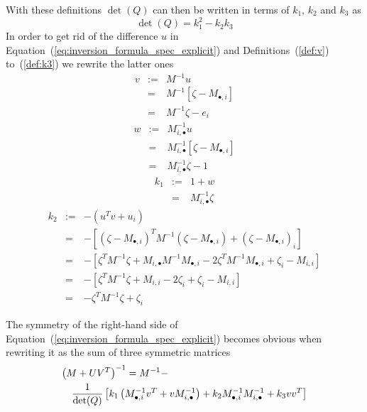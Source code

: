 \documentclass[a4paper]{article}
\begin{document}
With these definitions $\det(Q)$ can then be written in terms of
$k_{1}$, $k_{2}$ and $k_{3}$ as
\begin{equation}
\label{def:det_Q_k}
\det(Q)=k_{1}^{2}-k_{2}k_{3}
\end{equation}
In order to get rid of the difference $u$
in Equation~(\ref{eq:inversion_formula_spec_explicit}) and
Definitions~(\ref{def:v}) to~(\ref{def:k3}) we rewrite the latter ones
\begin{eqnarray}
\label{def:v_zeta}
v
&:=&
M^{-1}u
\nonumber \\
&=& 
M^{-1}\left[\zeta - M_{\bullet, i}\right]
\nonumber \\
&=&
M^{-1}\zeta - e_{i}
\end{eqnarray}
\begin{eqnarray}
\label{def:w_zeta}
w
&:=&
M^{-1}_{i, \bullet}u
\nonumber \\
&=&
M^{-1}_{i, \bullet}\left[\zeta - M_{\bullet, i}\right] 
\nonumber \\
&=&
M^{-1}_{i, \bullet}\zeta - 1
\end{eqnarray}
\begin{eqnarray}
\label{def:k_1_zeta}
k_{1}
&:=&
1 + w
\nonumber \\
&=&
M^{-1}_{i, \bullet}\zeta
\end{eqnarray}
\begin{eqnarray}
k_{2} &:=& -\left(u^{T}v + u_{i}\right) \nonumber \\
      &=& -\left[\left(\zeta-M_{\bullet,i}\right)^{T}
           M^{-1}\left(\zeta-M_{\bullet,i}\right)
	   + \left(\zeta-M_{\bullet,i}\right)_{i}
	   \right]   \nonumber \\
      &=& -\left[\zeta^{T}M^{-1}\zeta
        +M_{i,\bullet}M^{-1}M_{\bullet,i}
	          -2\zeta^{T}M^{-1}M_{\bullet,i} 
         	  +\zeta_{i} - M_{i,i}
	   \right] \nonumber \\
      &=& -\left[\zeta^{T}M^{-1}\zeta + M_{i,i}
                  -2\zeta_{i} + \zeta_{i} - M_{i,i}
            \right] \nonumber \\
      &=& -\zeta^{T}M^{-1}\zeta + \zeta_{i}
\end{eqnarray}

The symmetry of the right-hand side of
Equation~(\ref{eq:inversion_formula_spec_explicit}) becomes obvious when
rewriting it as the sum of three symmetric matrices
\begin{eqnarray*}
\lefteqn{\left(M+ UV^{T}\right)^{-1}=M^{-1}-}  \\
& & \frac{1}{\det(Q)}
\left[
k_{1}\left(
  M^{-1}_{\bullet, i}v^{T}
  +vM^{-1}_{i,\bullet}
\right)
+
k_{2}M^{-1}_{\bullet, i}M^{-1}_{i, \bullet}
+
k_{3}vv^{T}
\right]
\end{eqnarray*}
\end{document}
